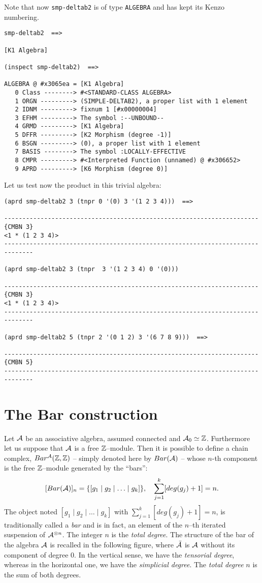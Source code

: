 Note that now {\tt smp-deltab2}  is of type {\tt ALGEBRA} and has kept
its Kenzo numbering.
{\footnotesize\begin{verbatim}
smp-deltab2  ==>

[K1 Algebra]

(inspect smp-deltab2)  ==>

ALGEBRA @ #x3065ea = [K1 Algebra]
   0 Class --------> #<STANDARD-CLASS ALGEBRA>
   1 ORGN ---------> (SIMPLE-DELTAB2), a proper list with 1 element
   2 IDNM ---------> fixnum 1 [#x00000004]
   3 EFHM ---------> The symbol :--UNBOUND--
   4 GRMD ---------> [K1 Algebra]
   5 DFFR ---------> [K2 Morphism (degree -1)]
   6 BSGN ---------> (0), a proper list with 1 element
   7 BASIS --------> The symbol :LOCALLY-EFFECTIVE
   8 CMPR ---------> #<Interpreted Function (unnamed) @ #x306652>
   9 APRD ---------> [K6 Morphism (degree 0)]
\end{verbatim}}
Let us test now the product in this trivial algebra:
{\footnotesize\begin{verbatim}
(aprd smp-deltab2 3 (tnpr 0 '(0) 3 '(1 2 3 4)))  ==>

----------------------------------------------------------------------{CMBN 3}
<1 * (1 2 3 4)>
------------------------------------------------------------------------------

(aprd smp-deltab2 3 (tnpr  3 '(1 2 3 4) 0 '(0)))

----------------------------------------------------------------------{CMBN 3}
<1 * (1 2 3 4)>
------------------------------------------------------------------------------

(aprd smp-deltab2 5 (tnpr 2 '(0 1 2) 3 '(6 7 8 9)))  ==>

----------------------------------------------------------------------{CMBN 5}
------------------------------------------------------------------------------
\end{verbatim}}

\section {The Bar construction}

Let $\cal A$ be an associative algebra, assumed connected and  ${\cal A}_0 \simeq {{\Bbb Z}}$. 
Furthermore let us suppose that ${\cal A}$ is a free ${{\Bbb Z}}$--module. Then it is possible 
to define a chain complex, $Bar^{\cal A}({\Bbb Z}, {\Bbb Z})$ -- simply denoted here by $Bar({\cal A})$ -- 
whose $n$-th component is the free ${{\Bbb Z}}$--module generated by the ``bars'':
$$ [Bar({\cal A})]_n = \{ [g_1 \mid g_2 \mid \ldots \mid g_k] \}, \quad \sum_{j=1}^{k} [deg(g_j)+1] =n. $$
The object noted $[g_1 \mid g_2 \mid \ldots \mid g_k]$ 
with $\sum_{j=1}^{k} [deg(g_j)+1] =n$, is tra\-di\-ti\-o\-nal\-ly 
called a {\em bar} and is in fact,  an element of the $n$--th iterated suspension of
${\cal A}^{\otimes n}$. The integer $n$ is the {\em total degree}. The structure of
the bar of the algebra ${\cal A}$ is recalled in the following figure, where $\bar{\cal A}$
is ${\cal A}$ without its component of degree $0$. In the vertical sense, we have the {\em tensorial degree},
whereas in the horizontal one, we have the {\em simplicial degree}. The {\em total degree} $n$ is the
sum of both degrees.

